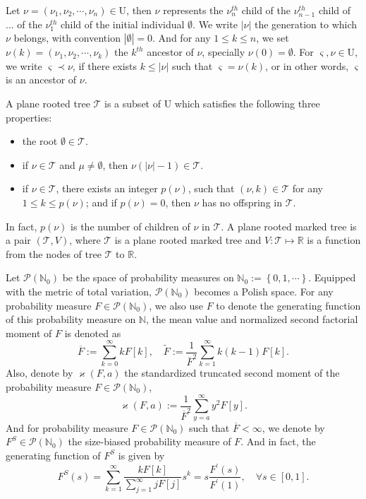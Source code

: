 \documentclass[]{article}
\numberwithin{equation}{section}
\theoremstyle{thmstyleone}%
\theoremstyle{thmstyletwo}%
\theoremstyle{thmstylethree}%
\theoremstyle{thmstylefour}%
\theoremstyle{thmstylefive}%
\theoremstyle{thmstylesix}%
\newcommand{\R}{\mathbb{R}}
\newcommand{\N}{\mathbb{N}}
\begin{document}
	Let $\nu = (\nu_1,\nu_2,\cdots,\nu_n)\in \mathrm{U}$, then $\nu$ represents the $\nu_n^{th}$ child of the $\nu_{n-1}^{th}$ child
	of ... of the $\nu_1^{th}$ child of the initial individual $\emptyset$.
	We write $|\nu|$ the generation to
	which $\nu$ belongs, with convention $|\emptyset| = 0$. And for any $1\leqslant k\leqslant n$, we set $\nu(k) = (\nu_1,\nu_2,\cdots,\nu_k)$ the $k^{th}$ ancestor of $\nu$, specially $\nu(0)=\emptyset$.
	For $\varsigma,\nu \in \mathrm{U}$, we write $\varsigma \prec \nu$, if there exists $k\leqslant |\nu|$ such that $\varsigma = \nu(k)$, or in other words, $\varsigma$ is an ancestor of $\nu$.
	
	A plane rooted tree $\mathcal{T}$ is a subset of $\mathrm{U}$ which satisfies the following three properties:
	\begin{itemize}
		\item the root $\emptyset\in\mathcal{T}$. 
		\item if $\nu\in\mathcal{T}$ and $\mu\neq \emptyset$, then $\nu(|\nu|-1) \in \mathcal{T}$.
		\item if $\nu \in \mathcal{T}$, there exists an integer $ p(\nu)$, such that $ (\nu,k)\in \mathcal{T} $ for any $1\leqslant k\leqslant p(\nu)$; and if $p(\nu)=0$, then $\nu$ has no offspring in $\mathcal{T}$.
	\end{itemize}
	In fact, $p(\nu)$ is the number of children of $\nu$ in $\mathcal{T}$.
	A plane rooted marked tree is a pair $(\mathcal{T},V)$, where $\mathcal{T}$ is a plane rooted marked tree and $V: \mathcal{T}\longmapsto \R$ is a function from the nodes of tree $\mathcal{T}$ to $\R$.
	
	Let $\mathcal{P}\left(\N_0\right)$ 
	be the space of probability measures on 
	$\N_0:=\left\{0,1,\cdots\right\}$.
	Equipped with the metric of total variation,
	$\mathcal{P}\left(\N_0\right)$ becomes a Polish space. 
	For any probability measure $F\in \mathcal{P}\left(\N_0\right)$, we also use $F$ to denote the generating function of this probability measure on $\N$, the mean value and normalized second factorial moment of $F$ is denoted as
	\begin{equation}\label{mean and stand-var}
		\overline{F}:= \sum_{k=0}^{\infty} k F[k],
		\quad\tilde{F}:=\dfrac{1}{\overline{F}^2} \sum_{k=1}^{\infty}k(k-1)F[k].
	\end{equation}
	Also, denote by $ \varkappa(F,a) $ 
	the standardized truncated second moment of 
	the probability measure $F\in \mathcal{P}\left(\N_0\right)$,
	\begin{equation}\label{6}
		\varkappa(F,a):= \dfrac{1}{\overline{F}^2} \sum_{y=a}^{\infty} y^2F[y].
	\end{equation}
    And for probability measure $F \in \mathcal{P}\left(\N_0\right)$ such that $\overline{F}<\infty$, we denote by $F^S \in \mathcal{P}\left(\N_0\right)$ the size-biased probability measure of $F$. And in fact, the generating function of $F^S$ is given by
    \begin{equation}\label{size-biased distribution}
    	F^S(s) = \sum_{k=1}^{\infty} \frac{kF[k]}{\sum_{j=1}^{\infty} jF[j]} s^k = s\frac{F^{\prime}(s)}{F^{\prime}(1)}, \quad \forall s\in [0,1] .
    \end{equation}
    
\end{document}
